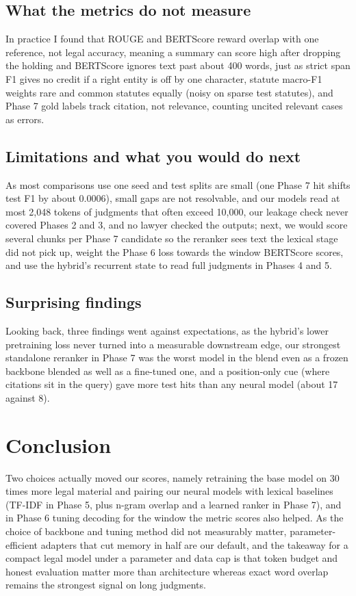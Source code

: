 \documentclass[11pt, oneside]{article}
\begin{document}
\subsection{What the metrics do not measure}
In practice I found that ROUGE and BERTScore reward overlap with one reference, not legal accuracy, meaning a summary can score high after dropping the holding and BERTScore ignores text past about 400 words, just as strict span F1 gives no credit if a right entity is off by one character, statute macro-F1 weights rare and common statutes equally (noisy on sparse test statutes), and Phase 7 gold labels track citation, not relevance, counting uncited relevant cases as errors.

\subsection{Limitations and what you would do next}
As most comparisons use one seed and test splits are small (one Phase 7 hit shifts test F1 by about 0.0006), small gaps are not resolvable, and our models read at most 2,048 tokens of judgments that often exceed 10,000, our leakage check never covered Phases 2 and 3, and no lawyer checked the outputs; next, we would score several chunks per Phase 7 candidate so the reranker sees text the lexical stage did not pick up, weight the Phase 6 loss towards the window BERTScore scores, and use the hybrid's recurrent state to read full judgments in Phases 4 and 5.

\subsection{Surprising findings}
Looking back, three findings went against expectations, as the hybrid's lower pretraining loss never turned into a measurable downstream edge, our strongest standalone reranker in Phase 7 was the worst model in the blend even as a frozen backbone blended as well as a fine-tuned one, and a position-only cue (where citations sit in the query) gave more test hits than any neural model (about 17 against 8).
\section{Conclusion}
Two choices actually moved our scores, namely retraining the base model on 30 times more legal material and pairing our neural models with lexical baselines (TF-IDF in Phase 5, plus n-gram overlap and a learned ranker in Phase 7), and in Phase 6 tuning decoding for the window the metric scores also helped. As the choice of backbone and tuning method did not measurably matter, parameter-efficient adapters that cut memory in half are our default, and the takeaway for a compact legal model under a parameter and data cap is that token budget and honest evaluation matter more than architecture whereas exact word overlap remains the strongest signal on long judgments.
\end{document}
